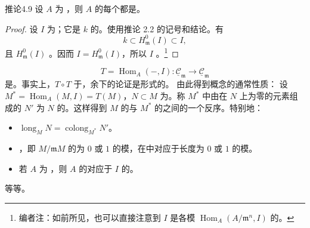 \begin{SGAresult}{推论}{4.9}
设 $A$ 为 ，则 $A$ 的每个都是。
\end{SGAresult}
\begin{proof}
设 $I$ 为；它是 $k$ 的。使用推论 2.2 的记号和结论。有
\[k\subset H^0_{\mathfrak m}(I)\subset I,\]
且 $H^0_{\mathfrak m}(I)$ 。因而 $I=H^0_{\mathfrak m}(I)$，所以 $I$ 。\footnote[5]{编者注：如前所见，也可以直接注意到 $I$ 是各模 $\operatorname{Hom}_A(A/\mathfrak m^n,I)$ 的。}
\end{proof}
\[T=\operatorname{Hom}_A(-,I):\underline{\mathcal C}_{\mathfrak m}\longrightarrow\underline{\mathcal C}_{\mathfrak m}\]
是。事实上，$T\circ T$ 于，余下的论证是形式的。
由此得到概念的通常性质：
设 $M^*=\operatorname{Hom}_A(M,I)=T(M)$，$N\subset M$ 为。称 $M^*$ 中由在 $N$ 上为零的元素组成的 $N'$ 为 $N$ 的。这样得到 $M$ 的与 $M^*$ 的之间的一个反序。特别地：
\begin{itemize}
\item $\operatorname{long}_M N=\operatorname{colong}_{M^*}N'$。
\item {}，即 $M/\mathfrak mM$ 的为 $0$ 或 $1$ 的模，在中对应于长度为 $0$ 或 $1$ 的模。
\item 若 $A$ 为 ，则 $A$ 的对应于 $I$ 的。
\end{itemize}
等等。

